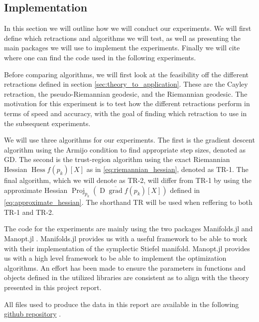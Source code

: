 \subsection{Implementation}
In this section we will outline how we will conduct our experiments. We will first define which retractions and algorithms we will test, as well as presenting the main packages we will use to implement the experiments. Finally we will cite where one can find the code used in the following experiments. 

Before comparing algorithms, we will first look at the feasibility off the different retractions defined in section \ref{sec:theory_to_application}. These are the Cayley retraction, the pseudo-Riemannian geodesic, and the Riemannian geodesic. The motivation for this experiment is to test how the different retractions perform in terms of speed and accuracy, with the goal of finding which retraction to use in the subsequent experiments.

We will use three algorithms for our experiments. The first is the gradient descent algorithm using the Armijo condition to find appropriate step sizes, denoted as GD. The second is the trust-region algorithm using the exact Riemannian Hessian $\operatorname{Hess}f(p_{k})[X]$ as in \eqref{eq:riemannian_hessian}, denoted as TR-1. The final algorithm, which we will denote as TR-2, will differ from TR-1 by using the approximate Hessian $\operatorname{Proj}_{p_{k}}(\operatorname{D}\overline{\operatorname{grad}}f(p_{k})[X])$ defined in \eqref{eq:approximate_hessian}. The shorthand TR will be used when reffering to both TR-1 and TR-2.

The code for the experiments are mainly using the two packages Manifolds.jl \cite{AxenBaranBergmannRzecki:2023} and Manopt.jl \cite{Bergmann2022}. Manifolds.jl provides us with a useful framework to be able to work with their implementation of the symplectic Stiefel manifold. Manopt.jl provides us with a high level framework to be able to implement the optimization algorithms. An effort has been made to ensure the parameters in functions and objects defined in the utilized libraries are consistent as to align with the theory presented in this project report. 

All files used to produce the data in this report are available in the following \href{https://github.com/kellertuer/TMA4500-Project-Hovland-Symplectic-Stiefel.git}{github repository} \cite{Hovland2024}. 